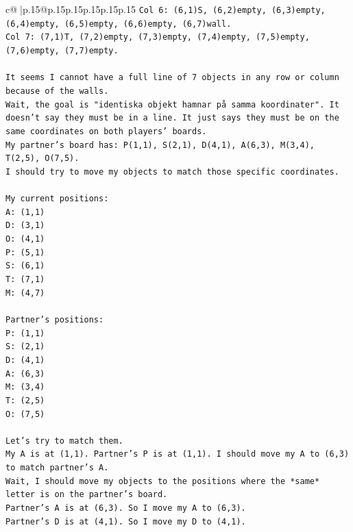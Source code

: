 \documentclass{article}
\begin{document}
{\begin{supertabular}{c@{$\;$}|p{.15\linewidth}@{}p{.15\linewidth}p{.15\linewidth}p{.15\linewidth}p{.15\linewidth}p{.15\linewidth}}
{{{\texttt{Col 6: (6,1)S, (6,2)empty, (6,3)empty, (6,4)empty, (6,5)empty, (6,6)empty, (6,7)wall.} \\
\texttt{Col 7: (7,1)T, (7,2)empty, (7,3)empty, (7,4)empty, (7,5)empty, (7,6)empty, (7,7)empty.} \\
\\ 
\texttt{It seems I cannot have a full line of 7 objects in any row or column because of the walls.} \\
\texttt{Wait, the goal is "identiska objekt hamnar på samma koordinater". It doesn't say they must be in a line. It just says they must be on the same coordinates on both players' boards.} \\
\texttt{My partner's board has: P(1,1), S(2,1), D(4,1), A(6,3), M(3,4), T(2,5), O(7,5).} \\
\texttt{I should try to move my objects to match those specific coordinates.} \\
\\ 
\texttt{My current positions:} \\
\texttt{A: (1,1)} \\
\texttt{D: (3,1)} \\
\texttt{O: (4,1)} \\
\texttt{P: (5,1)} \\
\texttt{S: (6,1)} \\
\texttt{T: (7,1)} \\
\texttt{M: (4,7)} \\
\\ 
\texttt{Partner's positions:} \\
\texttt{P: (1,1)} \\
\texttt{S: (2,1)} \\
\texttt{D: (4,1)} \\
\texttt{A: (6,3)} \\
\texttt{M: (3,4)} \\
\texttt{T: (2,5)} \\
\texttt{O: (7,5)} \\
\\ 
\texttt{Let's try to match them.} \\
\texttt{My A is at (1,1). Partner's P is at (1,1). I should move my A to (6,3) to match partner's A.} \\
\texttt{Wait, I should move my objects to the positions where the *same* letter is on the partner's board.} \\
\texttt{Partner's A is at (6,3). So I move my A to (6,3).} \\
\texttt{Partner's D is at (4,1). So I move my D to (4,1).} \\
}}}
\end{supertabular}}
\end{document}
